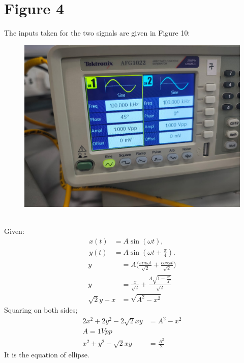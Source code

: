 \documentclass[a4paper,12pt]{article}
\numberwithin{equation}{section} %
\begin{document}
\section{Figure 4}
The inputs taken for the two signals are given in Figure 10:
\begin{figure}[h!]
    \centering
    \includegraphics[width=0.5\linewidth]{Tables/Table7.jpeg} 
    \caption{}
\end{figure}\\
\noindent Given:
\begin{align}
    x(t) &= A \sin (\omega t), \\
    y(t) &= A \sin (\omega t+\frac{\pi}{4}).
\end{align}
\begin{align}
    y&=A \bigg(\frac{sin{\omega t}}{\sqrt{2}}+\frac{cos{\omega t}}{\sqrt{2}}\bigg)\\
    y&=\frac{x}{\sqrt{2}}+\frac{A{\sqrt{1-\frac{x^2}{A^2}}}}{\sqrt{2}}\\
    \sqrt{2}y-x & =\sqrt{A^2-x^2}
\end{align}
Squaring on both sides;
\begin{align}
    2x^2+2y^2-2\sqrt{2}xy&=A^2-x^2\\
    A=1Vpp\\
    x^2+y^2-\sqrt{2}xy&=\frac{A^2}{2}
\end{align}
It is the equation of ellipse.
\end{document}
